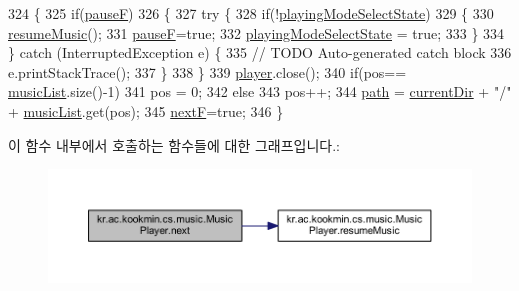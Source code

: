 \begin{DoxyCode}
324   \{
325     \textcolor{keywordflow}{if}(\hyperlink{classkr_1_1ac_1_1kookmin_1_1cs_1_1music_1_1_music_player_a9cbd432293e5e11088c6bfb4b31db11c}{pauseF})
326     \{
327       \textcolor{keywordflow}{try} \{
328         \textcolor{keywordflow}{if}(!\hyperlink{classkr_1_1ac_1_1kookmin_1_1cs_1_1music_1_1_music_player_ae2610567e63c44b6bba0eabdd1868e33}{playingModeSelectState})
329         \{
330           \hyperlink{classkr_1_1ac_1_1kookmin_1_1cs_1_1music_1_1_music_player_a889d56a689747ddb862ae3a76f682803}{resumeMusic}();
331           \hyperlink{classkr_1_1ac_1_1kookmin_1_1cs_1_1music_1_1_music_player_a9cbd432293e5e11088c6bfb4b31db11c}{pauseF}=\textcolor{keyword}{true};
332           \hyperlink{classkr_1_1ac_1_1kookmin_1_1cs_1_1music_1_1_music_player_ae2610567e63c44b6bba0eabdd1868e33}{playingModeSelectState} = \textcolor{keyword}{true};
333         \}
334       \} \textcolor{keywordflow}{catch} (InterruptedException e) \{
335         \textcolor{comment}{// TODO Auto-generated catch block}
336         e.printStackTrace();
337       \}
338     \}
339     \hyperlink{classkr_1_1ac_1_1kookmin_1_1cs_1_1music_1_1_music_player_ae3ec295f2404ad30d9ff20208cda065e}{player}.close();
340     \textcolor{keywordflow}{if}(pos== \hyperlink{classkr_1_1ac_1_1kookmin_1_1cs_1_1music_1_1_music_player_a43bc24d44f1079340c3c9983c7df88a2}{musicList}.size()-1) 
341       pos = 0;
342     \textcolor{keywordflow}{else} 
343       pos++;
344     \hyperlink{classkr_1_1ac_1_1kookmin_1_1cs_1_1music_1_1_music_player_ae9763f1d531b65e0be29470b24704f4f}{path} = \hyperlink{classkr_1_1ac_1_1kookmin_1_1cs_1_1music_1_1_music_player_a2614e5b1bf00c55b57e08354bcb6be19}{currentDir} + \textcolor{stringliteral}{"/"} + \hyperlink{classkr_1_1ac_1_1kookmin_1_1cs_1_1music_1_1_music_player_a43bc24d44f1079340c3c9983c7df88a2}{musicList}.get(pos);
345     \hyperlink{classkr_1_1ac_1_1kookmin_1_1cs_1_1music_1_1_music_player_a5cbb89ee2337edc2838f332c8b5e5160}{nextF}=\textcolor{keyword}{true};
346   \}
\end{DoxyCode}


이 함수 내부에서 호출하는 함수들에 대한 그래프입니다.\+:\nopagebreak
\begin{figure}[H]
\begin{center}
\leavevmode
\includegraphics[width=350pt]{classkr_1_1ac_1_1kookmin_1_1cs_1_1music_1_1_music_player_a909399c619c52785970eeed2e87e1f18_cgraph}
\end{center}
\end{figure}




